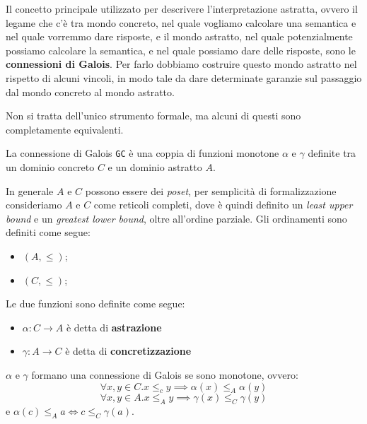 Il concetto principale utilizzato per descrivere l'interpretazione astratta,
ovvero il legame che c'è tra mondo concreto, nel quale vogliamo calcolare una 
semantica e nel quale vorremmo dare risposte, e il mondo astratto,
nel quale potenzialmente possiamo calcolare la semantica, e nel quale possiamo 
dare delle risposte, sono le \textbf{connessioni di Galois}.
Per farlo dobbiamo costruire questo mondo astratto nel rispetto di 
alcuni vincoli, in modo tale da dare determinate garanzie sul passaggio dal mondo 
concreto al mondo astratto.

Non si tratta dell'unico strumento formale, ma alcuni di questi sono 
completamente equivalenti.

\begin{tcolorbox}[title = Connessione di Galois]
    La connessione di Galois \texttt{GC} è una coppia di funzioni monotone 
    $\alpha$ e $\gamma$ definite tra un dominio concreto $C$ e un dominio
    astratto $A$.
\end{tcolorbox}
In generale $A$ e $C$ possono essere dei \textit{poset}, per semplicità di 
formalizzazione consideriamo $A$ e $C$ come reticoli completi, dove è quindi 
definito un \textit{least upper bound} e un \textit{greatest lower bound}, oltre 
all'ordine parziale. Gli ordinamenti sono definiti come segue:
\begin{itemize}
    \item $(A, \leq)$;
    \item $(C, \leq)$;
\end{itemize}

Le due funzioni sono definite come segue:
\begin{itemize}
    \item $\alpha: C \rightarrow A$ è detta di \textbf{astrazione}
    \item $\gamma: A \rightarrow C$ è detta di \textbf{concretizzazione}
\end{itemize}
$\alpha$ e $\gamma$ formano una connessione di Galois se sono monotone, ovvero: 
\[
    \forall x, y \in C . x \leq_c y \implies \alpha(x) \leq_A \alpha(y)
\]
\[
    \forall x, y \in A . x \leq_A y \implies \gamma(x) \leq_C \gamma(y)
\]
e $\alpha(c) \leq_A a \iff c \leq_C \gamma(a)$.

